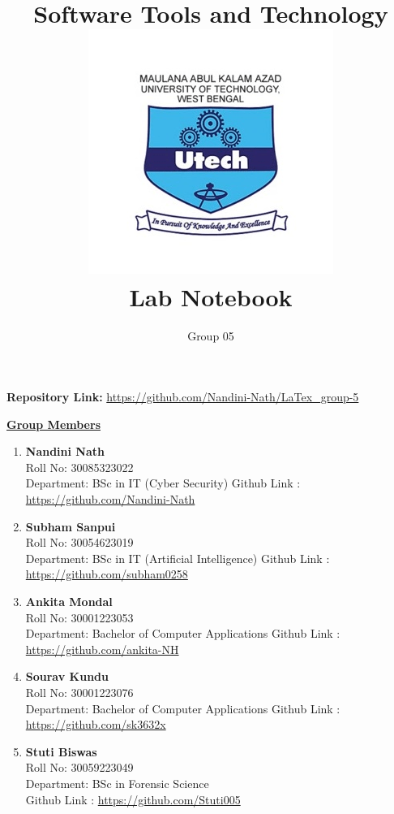 \documentclass[12pt, a4paper]{article}
\title{
    \vspace{-2.5cm}
    \Huge \textbf{\color{black!60} Software Tools and Technology}\\[0.5cm]
    \includegraphics[width=0.3\linewidth]{Makaut.png}\\[0.2cm]
    \LARGE \textbf{\color{black} Lab Notebook}
}
\author{
    \vspace{1.3cm}
    \Large Group 05
}
\date{} %
\begin{document}
\maketitle
{}


\vspace{-2cm}
\begin{center}
\textbf{Repository Link:} \href{https://github.com/Nandini-Nath/LaTex_group-5}{\textcolor{blue!60}{https://github.com/Nandini-Nath/LaTex\_group-5}}
\end{center}

\vspace{0.5cm}

\centering
\bfseries{\underline{\Large \textcolor{blue!60}{Group Members}}}
\vspace{0.4cm}

\begin{flushleft}
\begin{enumerate}
    \item \textbf{Nandini Nath} \\
    Roll No: 30085323022 \\
    Department: BSc in IT (Cyber Security)
    Github Link : \url{https://github.com/Nandini-Nath}
    \item \textbf{Subham Sanpui} \\
    Roll No: 30054623019 \\
    Department: BSc in IT (Artificial Intelligence)
    Github Link : \url{https://github.com/subham0258}
    \item \textbf{Ankita Mondal} \\
    Roll No: 30001223053 \\
    Department: Bachelor of Computer Applications
    Github Link : \url{https://github.com/ankita-NH}
    \item \textbf{Sourav Kundu} \\
    Roll No: 30001223076 \\
    Department: Bachelor of Computer Applications
    Github Link : \url{https://github.com/sk3632x}
    \item \textbf{Stuti Biswas} \\
    Roll No: 30059223049 \\
    Department: BSc in Forensic Science \\
    Github Link : \url {https://github.com/Stuti005}
\end{enumerate}
\end{flushleft}
\end{document}
